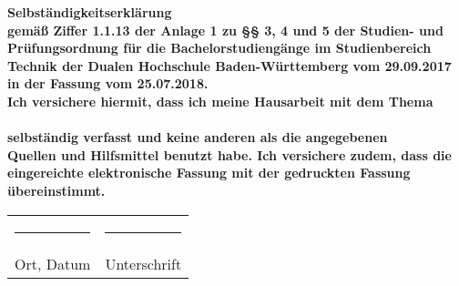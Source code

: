 \thispagestyle{empty}
\begin{center}
	\vspace*{2cm}
	\Huge\bf Selbständigkeitserklärung\\
	\vspace*{3cm}
	\normalsize\rm
	gemäß Ziffer 1.1.13 der Anlage 1 zu §§ 3, 4 und 5  der Studien- und Prüfungsordnung für die Bachelorstudiengänge im Studienbereich Technik der Dualen Hochschule Baden-Württemberg vom 29.09.2017 in der Fassung vom 25.07.2018.\\
	Ich versichere hiermit, dass ich meine Hausarbeit mit dem Thema\\
	\vspace*{2cm}
	\Large\bf\myTopic\\
	\vspace*{2cm}
	\normalsize\rm
	selbständig verfasst und keine anderen als die angegebenen\\Quellen und Hilfsmittel benutzt habe. Ich versichere zudem, dass die eingereichte elektronische Fassung mit der gedruckten Fassung übereinstimmt.\\
	\vfill
	\begin{tabularx}{0.78\textwidth}{l@{\extracolsep\fill}l}
		\rule{4cm}{0.3mm}&\rule{4cm}{0.3mm}\\
	Ort, Datum&Unterschrift
	\end{tabularx}
\end{center}

\newpage
